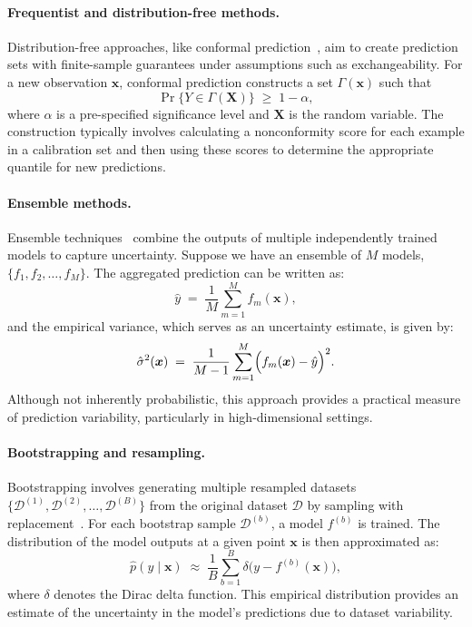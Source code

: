 \paragraph{Frequentist and distribution-free methods.}
Distribution-free approaches, like conformal prediction~\citep{shafer2008tutorial, fontana2023conformal}, aim to create prediction sets with finite-sample guarantees under assumptions such as exchangeability. For a new observation $\bm{x}$, conformal prediction constructs a set $\Gamma(\bm{x})$ such that
\begin{equation}
\Pr\{ Y \in \Gamma(\bm{X}) \} \;\geq\; 1 - \alpha,
\end{equation}
where $\alpha$ is a pre-specified significance level and $\bm{X}$ is the random variable. The construction typically involves calculating a nonconformity score for each example in a calibration set and then using these scores to determine the appropriate quantile for new predictions.

\paragraph{Ensemble methods.}
Ensemble techniques~\citep{lakshminarayanan2017simple} combine the outputs of multiple independently trained models to capture uncertainty. Suppose we have an ensemble of $M$ models, $\{ f_1, f_2, \dots, f_M \}$. The aggregated prediction can be written as:
\begin{equation}
\hat{y} \;=\; \frac{1}{M} \sum_{m=1}^{M} f_m(\bm{x}),
\end{equation}
and the empirical variance, which serves as an uncertainty estimate, is given by:
\begin{equation}
\hat{\sigma}^2(\bm{x}) \;=\; \frac{1}{M-1} \sum_{m=1}^{M} \Bigl( f_m(\bm{x}) - \hat{y} \Bigr)^2.
\end{equation}
Although not inherently probabilistic, this approach provides a practical measure of prediction variability, particularly in high-dimensional settings.

\paragraph{Bootstrapping and resampling.}
Bootstrapping involves generating multiple resampled datasets $\{\mathcal{D}^{(1)}, \mathcal{D}^{(2)}, \dots, \mathcal{D}^{(B)}\}$ from the original dataset $\mathcal{D}$ by sampling with replacement~\citep{breiman1996bagging}. For each bootstrap sample $\mathcal{D}^{(b)}$, a model $f^{(b)}$ is trained. The distribution of the model outputs at a given point $\bm{x}$ is then approximated as:
\begin{equation}
\hat{p}(y \mid \bm{x}) \;\approx\; \frac{1}{B} \sum_{b=1}^{B} \delta\bigl(y - f^{(b)}(\bm{x})\bigr),
\end{equation}
where $\delta$ denotes the Dirac delta function. This empirical distribution provides an estimate of the uncertainty in the model's predictions due to dataset variability.

